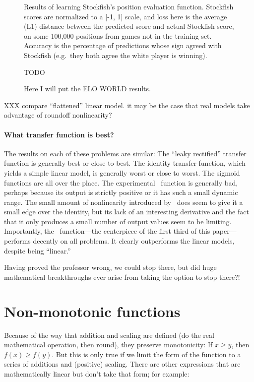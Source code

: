 \documentclass[twocolumn]{article}
\begin{document}
\begin{figure}[htp]
  
  \caption{
    Results of learning Stockfish's position evaluation function.
    Stockfish scores are normalized to a [-1, 1] scale, and loss
    here is the average (L1) distance between the predicted score
    and actual Stockfish score, on some 100,000 positions from
    games not in the training set. Accuracy is the percentage of
    predictions whose sign agreed with Stockfish (e.g.~they both
    agree the white player is winning).
  } \label{fig:chessresults}
\end{figure}

\begin{figure}[htp]
  TODO
  \caption{Here I will put the ELO WORLD results.}
  \label{fig:elo}
\end{figure}

XXX compare ``flattened'' linear model. it may be the case
that real models take advantage of roundoff nonlinearity?

\paragraph{What transfer function is best?}
The results on each of these problems are similar: The ``leaky
rectified'' transfer function is generally best or close to best.
The identity transfer function, which yields a simple linear model,
is generally worst or close to worst. The sigmoid functions are
all over the place. The experimental \downshifttwo\ function is
generally bad, perhaps because its output is strictly positive or
it has such a small dynamic range. The small amount of nonlinearity
introduced by \plussixtyfour\ does seem to give it a small edge
over the identity, but its lack of an interesting derivative and
the fact that it only produces a small number of output values seem
to be limiting. Importantly, the \gradone\ function---the
centerpiece of the first third of this paper---performs decently on
all problems. It clearly outperforms the linear models, despite
being ``linear.''

Having proved the professor wrong, we could stop there, but did huge
mathematical breakthroughs ever arise from taking the option to stop
there?!


\section{Non-monotonic functions}
Because of the way that addition and scaling are defined (do the real
mathematical operation, then round), they preserve monotonicity: If $x
\geq y$, then $f(x) \geq f(y)$. But this is only true if we limit the
form of the function to a series of additions and (positive) scaling.
There are other expressions that are mathematically linear but don't
take that form; for example:
\end{document}
